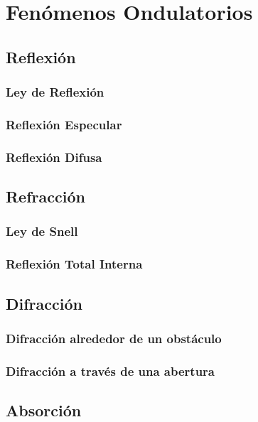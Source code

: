 \chapter{Fenómenos Ondulatorios}%
\section{Reflexión}%

\subsection{Ley de Reflexión}

\subsection{Reflexión Especular}

\subsection{Reflexión Difusa}

\section{Refracción}

\subsection{Ley de Snell}

\subsection{Reflexión Total Interna} \label{lbl-reftotint}

\section{Difracción}

\subsection{Difracción alrededor de un obstáculo}

\subsection{Difracción a través de una abertura}

\section{Absorción}

